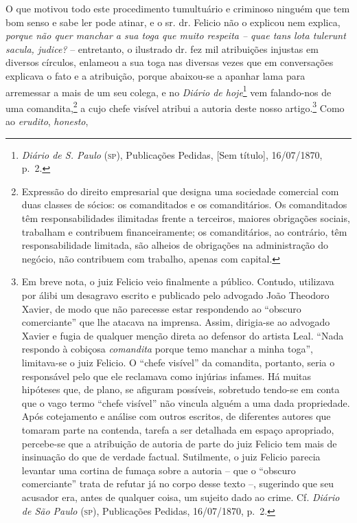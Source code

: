 O que motivou todo este procedimento tumultuário e criminoso ninguém que
tem bom senso e sabe ler pode atinar, e o sr. dr. Felicio não o explicou
nem explica, \emph{porque não quer manchar a sua toga que muito respeita
-- quae tans lota tulerunt sacula, judice?} -- entretanto, o ilustrado
dr. fez mil atribuições injustas em diversos círculos, enlameou a sua
toga nas diversas vezes que em conversações explicava o fato e a
atribuição, porque abaixou-se a apanhar lama para arremessar a mais de
um seu colega, e no \emph{Diário de hoje}\footnote{ \emph{Diário de S.
  Paulo} (\textsc{sp}), Publicações Pedidas, {[}Sem título{]}, 16/07/1870, p.~2.}
vem falando-nos de uma comandita,\footnote{ Expressão do direito
  empresarial que designa uma sociedade comercial com duas classes de
  sócios: os comanditados e os comanditários. Os comanditados têm
  responsabilidades ilimitadas frente a terceiros, maiores obrigações
  sociais, trabalham e contribuem financeiramente; os comanditários, ao
  contrário, têm responsabilidade limitada, são alheios de obrigações na
  administração do negócio, não contribuem com trabalho, apenas com
  capital.} a cujo chefe visível atribui a autoria deste nosso
artigo.\footnote{ Em breve nota, o juiz Felicio veio finalmente a
  público. Contudo, utilizava por álibi um desagravo escrito e publicado
  pelo advogado João Theodoro Xavier, de modo que não parecesse estar
  respondendo ao ``obscuro comerciante'' que lhe atacava na imprensa.
  Assim, dirigia-se ao advogado Xavier e fugia de qualquer menção direta
  ao defensor do artista Leal. ``Nada respondo à cobiçosa
  \emph{comandita} porque temo manchar a minha toga'', limitava-se o juiz
  Felicio. O ``chefe visível'' da comandita, portanto, seria o responsável
  pelo que ele reclamava como injúrias infames. Há muitas hipóteses que,
  de plano, se afiguram possíveis, sobretudo tendo-se em conta que o
  vago termo ``chefe visível'' não vincula alguém a uma dada propriedade.
  Após cotejamento e análise com outros escritos, de diferentes autores
  que tomaram parte na contenda, tarefa a ser detalhada em espaço
  apropriado, percebe-se que a atribuição de autoria de parte do juiz
  Felicio tem mais de insinuação do que de verdade factual. Sutilmente,
  o juiz Felicio parecia levantar uma cortina de fumaça sobre a autoria
  -- que o ``obscuro comerciante'' trata de refutar já no corpo desse
  texto --, sugerindo que seu acusador era, antes de qualquer coisa, um
  sujeito dado ao crime. Cf. \emph{Diário de São Paulo} (\textsc{sp}), Publicações
  Pedidas, 16/07/1870, p.~2.} Como ao \emph{erudito}, \emph{honesto},
